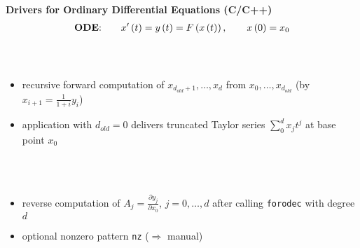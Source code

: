 \documentclass[12pt,oneside,a4paper]{article}
\begin{document}
\newpage
\begin{center}\Large
{\Huge \bf Drivers for Ordinary Differential Equations
           (C/C++)}\\[-0.5ex]
\begin{align*}
      \text{{\bf ODE}:}\qquad 
      x'\left(t\right)=y\left(t\right)=F\left(x\left(t\right)\right),
      \qquad x\left(0\right) = x_0
\end{align*}\\[2ex]
%
\\[2ex]
\begin{minipage}[h]{15cm}
\small 
\begin{itemize}
\item recursive forward computation of $x_{d_{old}+1},\ldots,x_d$ from 
      $x_0,\ldots,x_{d_{old}}$ (by $x_{i+1} = \frac{1}{1+i}y_i$)
\item application with $d_{old}=0$ delivers truncated Taylor series 
      $\sum_0^d x_j t^j$ at base point $x_0$
\end{itemize}
\end{minipage}\\[2ex]
%
\\[2ex]
\begin{minipage}[h]{15cm}
\small 
\begin{itemize}
\item reverse computation of $A_j=\frac{\partial y_j}{\partial x_0}$,
  $j=0,\ldots,d$ after calling {\tt forodec} with degree $d$ 
\item  optional nonzero pattern {\tt nz} ($\Rightarrow$ manual)
\end{itemize}
\end{minipage}\\[2ex]
%
\\[2ex]
\begin{minipage}[h]{15cm}
\small 
\begin{itemize}

\end{itemize}
\end{minipage}
\end{center}
\end{document}
